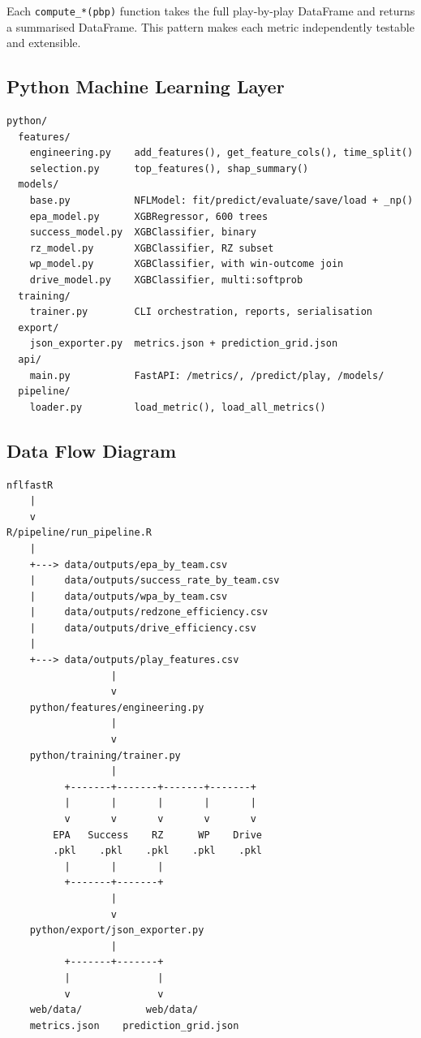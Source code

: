 \documentclass[11pt]{article}
\begin{document}
Each \texttt{compute\_*(pbp)} function takes the full play-by-play DataFrame
and returns a summarised DataFrame. This pattern makes each metric independently
testable and extensible.

\subsection{Python Machine Learning Layer}

\begin{verbatim}
python/
  features/
    engineering.py    add_features(), get_feature_cols(), time_split()
    selection.py      top_features(), shap_summary()
  models/
    base.py           NFLModel: fit/predict/evaluate/save/load + _np()
    epa_model.py      XGBRegressor, 600 trees
    success_model.py  XGBClassifier, binary
    rz_model.py       XGBClassifier, RZ subset
    wp_model.py       XGBClassifier, with win-outcome join
    drive_model.py    XGBClassifier, multi:softprob
  training/
    trainer.py        CLI orchestration, reports, serialisation
  export/
    json_exporter.py  metrics.json + prediction_grid.json
  api/
    main.py           FastAPI: /metrics/, /predict/play, /models/
  pipeline/
    loader.py         load_metric(), load_all_metrics()
\end{verbatim}

\subsection{Data Flow Diagram}

\begin{verbatim}
nflfastR
    |
    v
R/pipeline/run_pipeline.R
    |
    +---> data/outputs/epa_by_team.csv
    |     data/outputs/success_rate_by_team.csv
    |     data/outputs/wpa_by_team.csv
    |     data/outputs/redzone_efficiency.csv
    |     data/outputs/drive_efficiency.csv
    |
    +---> data/outputs/play_features.csv
                  |
                  v
    python/features/engineering.py
                  |
                  v
    python/training/trainer.py
                  |
          +-------+-------+-------+-------+
          |       |       |       |       |
          v       v       v       v       v
        EPA   Success    RZ      WP    Drive
        .pkl    .pkl    .pkl    .pkl    .pkl
          |       |       |
          +-------+-------+
                  |
                  v
    python/export/json_exporter.py
                  |
          +-------+-------+
          |               |
          v               v
    web/data/           web/data/
    metrics.json    prediction_grid.json
\end{verbatim}
\end{document}

